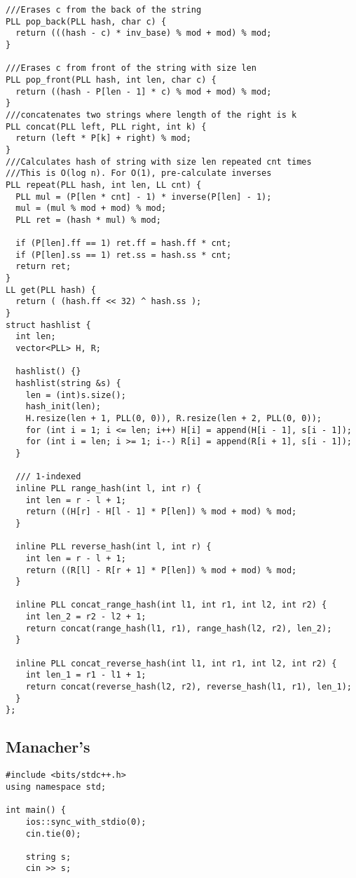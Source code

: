 \documentclass[FSZ,a4paper,onesided]{article}
\begin{document}
\begin{multicols*}{\COLS}
\begin{lstlisting}
///Erases c from the back of the string
PLL pop_back(PLL hash, char c) {
  return (((hash - c) * inv_base) % mod + mod) % mod;
}

///Erases c from front of the string with size len
PLL pop_front(PLL hash, int len, char c) {
  return ((hash - P[len - 1] * c) % mod + mod) % mod;
}
///concatenates two strings where length of the right is k
PLL concat(PLL left, PLL right, int k) {
  return (left * P[k] + right) % mod;
}
///Calculates hash of string with size len repeated cnt times
///This is O(log n). For O(1), pre-calculate inverses
PLL repeat(PLL hash, int len, LL cnt) {
  PLL mul = (P[len * cnt] - 1) * inverse(P[len] - 1);
  mul = (mul % mod + mod) % mod;
  PLL ret = (hash * mul) % mod;

  if (P[len].ff == 1) ret.ff = hash.ff * cnt;
  if (P[len].ss == 1) ret.ss = hash.ss * cnt;
  return ret;
}
LL get(PLL hash) {
  return ( (hash.ff << 32) ^ hash.ss );
}
struct hashlist {
  int len;
  vector<PLL> H, R;

  hashlist() {}
  hashlist(string &s) {
    len = (int)s.size();
    hash_init(len);
    H.resize(len + 1, PLL(0, 0)), R.resize(len + 2, PLL(0, 0));
    for (int i = 1; i <= len; i++) H[i] = append(H[i - 1], s[i - 1]);
    for (int i = len; i >= 1; i--) R[i] = append(R[i + 1], s[i - 1]);
  }
  
  /// 1-indexed
  inline PLL range_hash(int l, int r) {
    int len = r - l + 1;
    return ((H[r] - H[l - 1] * P[len]) % mod + mod) % mod;
  }

  inline PLL reverse_hash(int l, int r) {
    int len = r - l + 1;
    return ((R[l] - R[r + 1] * P[len]) % mod + mod) % mod;
  }

  inline PLL concat_range_hash(int l1, int r1, int l2, int r2) {
    int len_2 = r2 - l2 + 1;
    return concat(range_hash(l1, r1), range_hash(l2, r2), len_2);
  }

  inline PLL concat_reverse_hash(int l1, int r1, int l2, int r2) {
    int len_1 = r1 - l1 + 1;
    return concat(reverse_hash(l2, r2), reverse_hash(l1, r1), len_1);
  }
};\end{lstlisting}
\subsection{Manacher's}
\begin{lstlisting}
#include <bits/stdc++.h>
using namespace std;

int main() {
    ios::sync_with_stdio(0);
    cin.tie(0);

    string s;
    cin >> s;


\end{lstlisting}
\end{multicols*}
\end{document}
